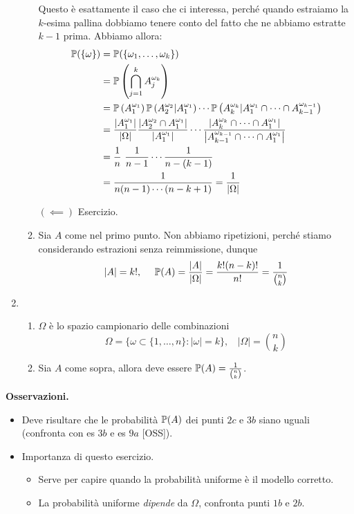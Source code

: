 \begin{enumerate}
\begin{enumerate}
		\begin{rem}
			Questo è esattamente il caso che ci interessa, perché quando estraiamo la $k$-esima pallina dobbiamo tenere conto del fatto che ne abbiamo estratte $k-1$ prima. Abbiamo allora:
			\begin{align*}
				\mathbb{P}(\{\omega \}) & =\mathbb{P}(\{\omega_{1} ,\dots ,\omega_{k}\})\\
				 & =\mathbb{P}\left(\bigcap_{j=1}^{k} A_{j}^{\omega_{k}}\right)\\
				 & =\mathbb{P}\left(A_{1}^{\omega_{1}}\right)\mathbb{P}\left(A_{2}^{\omega_{2}} |A_{1}^{\omega_{1}}\right) \cdots \mathbb{P}\left(A_{k}^{\omega_{k}} |A_{1}^{\omega_{1}} \cap \cdots \cap A_{k-1}^{\omega_{k-1}}\right)\\
				 & =\frac{\left| A_{1}^{\omega_{1}}\right| }{|\Omega| }\frac{\left| A_{2}^{\omega_{2}} \cap A_{1}^{\omega_{1}}\right| }{\left| A_{1}^{\omega_{1}}\right| } \cdots \frac{| A_{k}^{\omega_{k}} \cap \cdots \cap A_{1}^{\omega_{1}} |}{\left| A_{k-1}^{\omega_{k-1}} \cap \cdots \cap A_{1}^{\omega_{1}}\right| }\\
				 & =\frac{1}{n} \ \frac{1}{n-1} \cdots \frac{1}{n-(k-1)}\\
				 & =\frac{1}{n(n-1) \cdots (n-k+1)} =\frac{1}{|\Omega| }
			\end{align*}
		\end{rem}

		$(\impliedby)$ Esercizio.
		\item Sia $A$ come nel primo punto. Non abbiamo ripetizioni, perché stiamo considerando estrazioni senza reimmissione, dunque
		\begin{equation*}
			| A| =k!,\ \ \ \ \mathbb{P}(A) =\frac{| A| }{|\Omega| } =\frac{k!(n-k) !}{n!} =\frac{1}{\binom{n}{k}}
		\end{equation*}
	\end{enumerate}
	\item 
	\begin{enumerate}
		\item $\Omega $ è lo spazio campionario delle combinazioni
		\begin{equation*}
			\Omega =\{\omega \subset \{1,\dots ,n\} :|\omega| =k\} ,\ \ \ \ |\Omega| =\binom{n}{k}
		\end{equation*}
		\item Sia $A$ come sopra, allora deve essere $\mathbb{P}(A) =\frac{1}{\binom{n}{k}}$.
	\end{enumerate}
\end{enumerate}

\textbf{Osservazioni.}
\begin{itemize}
	\item Deve risultare che le probabilità $\mathbb{P}(A)$ dei punti $2c$ e $3b$ siano uguali (confronta con es $3b$ e es $9a$ [OSS]).
	\item Importanza di questo esercizio.
	\begin{itemize}
		\item Serve per capire quando la probabilità uniforme è il modello corretto.
		\item La probabilità uniforme \textit{dipende} da $\Omega $, confronta punti $1b$ e $2b$.
	\end{itemize}
\end{itemize}

